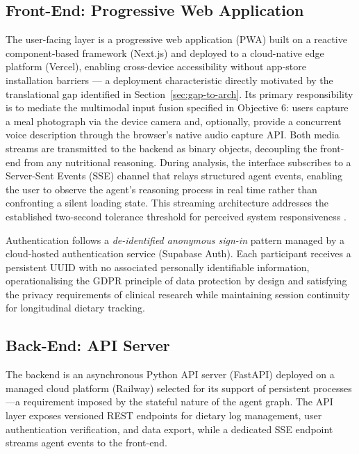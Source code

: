 \subsection{Front-End: Progressive Web Application}

The user-facing layer is a progressive web application (PWA) built on a reactive component-based framework (Next.js) and deployed to a cloud-native edge platform (Vercel), enabling cross-device accessibility without app-store installation barriers --- a deployment characteristic directly motivated by the translational gap identified in Section~\ref{sec:gap-to-arch}. Its primary responsibility is to mediate the multimodal input fusion specified in Objective 6: users capture a meal photograph via the device camera and, optionally, provide a concurrent voice description through the browser's native audio capture API. Both media streams are transmitted to the backend as binary objects, decoupling the front-end from any nutritional reasoning. During analysis, the interface subscribes to a Server-Sent Events (SSE) channel that relays structured agent events, enabling the user to observe the agent's reasoning process in real time rather than confronting a silent loading state. This streaming architecture addresses the established two-second tolerance threshold for perceived system responsiveness \citep{nahStudyTolerableWaiting2004}.

Authentication follows a \emph{de-identified anonymous sign-in} pattern managed by a cloud-hosted authentication service (Supabase Auth). Each participant receives a persistent UUID with no associated personally identifiable information, operationalising the GDPR principle of data protection by design \citep[Article 25]{europeanparliamentRegulationEU20162016} and satisfying the privacy requirements of clinical research while maintaining session continuity for longitudinal dietary tracking.

\subsection{Back-End: API Server}

The backend is an asynchronous Python API server (FastAPI) deployed on a managed cloud platform (Railway) selected for its support of persistent processes---a requirement imposed by the stateful nature of the agent graph. The API layer exposes versioned REST endpoints for dietary log management, user authentication verification, and data export, while a dedicated SSE endpoint streams agent events to the front-end.


